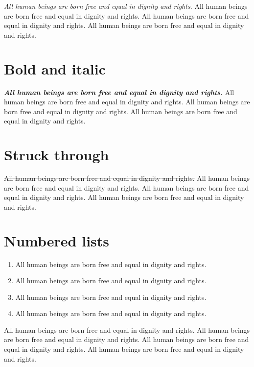\documentclass[
  titlepage,
  openright,
  DIV=calc,
  toc=listof,
  listof=nochaptergap]{scrbook}
\providecommand{\tightlist}{%
  \setlength{\itemsep}{0pt}\setlength{\parskip}{0pt}}
\begin{document}
\emph{All human beings are born free and equal in dignity and rights.}
All human beings are born free and equal in dignity and rights. All
human beings are born free and equal in dignity and rights. All human
beings are born free and equal in dignity and rights.

\hypertarget{bold-and-italic}{%
\section{Bold and italic}\label{bold-and-italic}}

\textbf{\emph{All human beings are born free and equal in dignity and
rights.}} All human beings are born free and equal in dignity and
rights. All human beings are born free and equal in dignity and rights.
All human beings are born free and equal in dignity and rights.

\hypertarget{struck-through}{%
\section{Struck through}\label{struck-through}}

\sout{All human beings are born free and equal in dignity and rights.}
All human beings are born free and equal in dignity and rights. All
human beings are born free and equal in dignity and rights. All human
beings are born free and equal in dignity and rights.

\hypertarget{numbered-lists}{%
\section{Numbered lists}\label{numbered-lists}}

\begin{enumerate}
\def\labelenumi{\arabic{enumi}.}
\tightlist
\item
  All human beings are born free and equal in dignity and rights.
\item
  All human beings are born free and equal in dignity and rights.
\item
  All human beings are born free and equal in dignity and rights.
\item
  All human beings are born free and equal in dignity and rights.
\end{enumerate}

All human beings are born free and equal in dignity and rights. All
human beings are born free and equal in dignity and rights. All human
beings are born free and equal in dignity and rights. All human beings
are born free and equal in dignity and rights.
\end{document}
